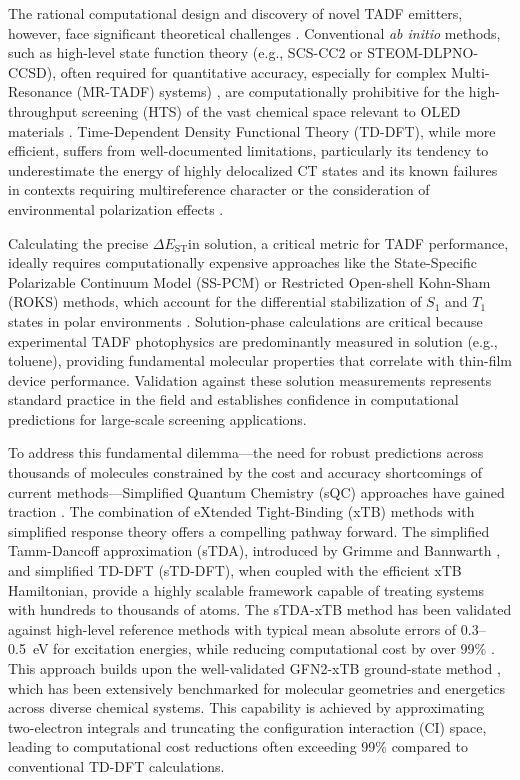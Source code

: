 \documentclass[journal=jcisd8,manuscript=article,keywords=true]{achemso}
\newcommand{\deltaest}{$\Delta E_{\text{ST}}$}
\begin{document}
The rational computational design and discovery of novel TADF emitters, however, face significant theoretical challenges \cite{Olivier2018, Gomez-Bombarelli2016}. Conventional \textit{ab initio} methods, such as high-level state function theory (e.g., SCS-CC2 or STEOM-DLPNO-CCSD), often required for quantitative accuracy, especially for complex Multi-Resonance (MR-TADF) systems) \cite{Kang2024, Wu2025}, are computationally prohibitive for the high-throughput screening (HTS) of the vast chemical space relevant to OLED materials \cite{Olivier2017a}. Time-Dependent Density Functional Theory (TD-DFT), while more efficient, suffers from well-documented limitations, particularly its tendency to underestimate the energy of highly delocalized CT states and its known failures in contexts requiring multireference character or the consideration of environmental polarization effects \cite{Dreuw2004, Mewes2018, Jacquemin2009, Froitzheim2022}. 

Calculating the precise \deltaest in solution, a critical metric for TADF performance, ideally requires computationally expensive approaches like the State-Specific Polarizable Continuum Model (SS-PCM) or Restricted Open-shell Kohn-Sham (ROKS) methods, which account for the differential stabilization of $S_1$ and $T_1$ states in polar environments \cite{Loos2020STGABS27, Laurent2013TDDFT}. Solution-phase calculations are critical because experimental TADF photophysics are predominantly measured in solution (e.g., toluene), providing fundamental molecular properties that correlate with thin-film device performance. Validation against these solution measurements represents standard practice in the field and establishes confidence in computational predictions for large-scale screening applications.

To address this fundamental dilemma—the need for robust predictions across thousands of molecules constrained by the cost and accuracy shortcomings of current 
methods—Simplified Quantum Chemistry (sQC) approaches have gained traction \cite{bannwarth2021extended}. The combination of eXtended 
Tight-Binding (xTB) methods with simplified response theory offers a compelling pathway forward. The simplified Tamm-Dancoff approximation 
(sTDA), introduced by Grimme and Bannwarth \cite{Grimme2016}, and simplified TD-DFT (sTD-DFT), when coupled with the efficient xTB Hamiltonian, provide 
a highly scalable framework capable of treating systems with hundreds to thousands of atoms. The sTDA-xTB method has been validated against high-level reference 
methods with typical mean absolute errors of 0.3--0.5~eV for excitation energies, while reducing computational cost by over 99\% \cite{Grimme2016}. This 
approach builds upon the well-validated GFN2-xTB ground-state method \cite{Bannwarth2019_GFN2xTB}, which has been extensively benchmarked for molecular 
geometries and energetics across diverse chemical systems. This capability is achieved by approximating two-electron integrals and truncating the configuration 
interaction (CI) space, leading to computational cost reductions often exceeding 99\% compared to conventional TD-DFT calculations.
\end{document}
